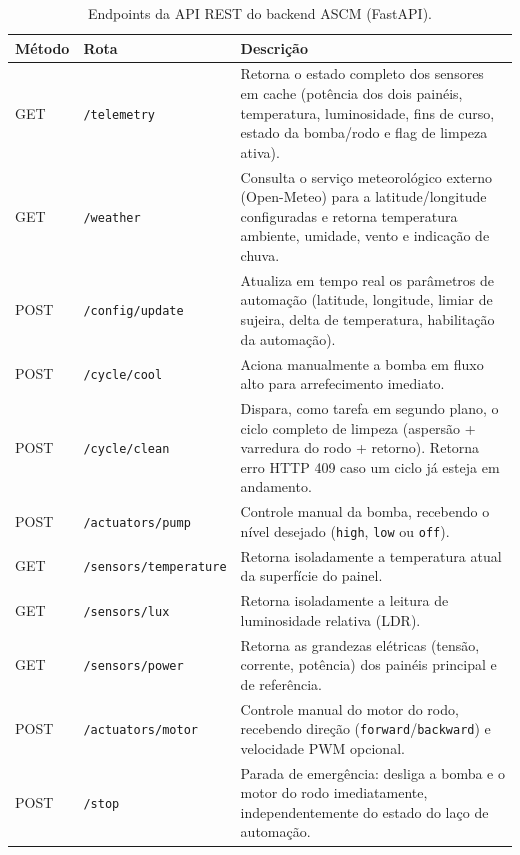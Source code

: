\documentclass[12pt, a4paper]{article}
\begin{document}
\begin{table}[htbp]
    \centering
    \caption{Endpoints da API REST do backend ASCM (FastAPI).}
    \label{tab:endpoints}
    \begin{tabular}{p{1.4cm}p{3.2cm}p{7.2cm}}
    \toprule
    \textbf{Método} & \textbf{Rota} & \textbf{Descrição} \\
    \midrule
    GET & \texttt{/telemetry} & Retorna o estado completo dos sensores em cache (potência dos dois painéis, temperatura, luminosidade, fins de curso, estado da bomba/rodo e flag de limpeza ativa). \\
    GET & \texttt{/weather} & Consulta o serviço meteorológico externo (Open-Meteo) para a latitude/longitude configuradas e retorna temperatura ambiente, umidade, vento e indicação de chuva. \\
    POST & \texttt{/config/update} & Atualiza em tempo real os parâmetros de automação (latitude, longitude, limiar de sujeira, delta de temperatura, habilitação da automação). \\
    POST & \texttt{/cycle/cool} & Aciona manualmente a bomba em fluxo alto para arrefecimento imediato. \\
    POST & \texttt{/cycle/clean} & Dispara, como tarefa em segundo plano, o ciclo completo de limpeza (aspersão + varredura do rodo + retorno). Retorna erro HTTP 409 caso um ciclo já esteja em andamento. \\
    POST & \texttt{/actuators/pump} & Controle manual da bomba, recebendo o nível desejado (\texttt{high}, \texttt{low} ou \texttt{off}). \\
    GET & \texttt{/sensors/temperature} & Retorna isoladamente a temperatura atual da superfície do painel. \\
    GET & \texttt{/sensors/lux} & Retorna isoladamente a leitura de luminosidade relativa (LDR). \\
    GET & \texttt{/sensors/power} & Retorna as grandezas elétricas (tensão, corrente, potência) dos painéis principal e de referência. \\
    POST & \texttt{/actuators/motor} & Controle manual do motor do rodo, recebendo direção (\texttt{forward}/\texttt{backward}) e velocidade PWM opcional. \\
    POST & \texttt{/stop} & Parada de emergência: desliga a bomba e o motor do rodo imediatamente, independentemente do estado do laço de automação. \\
    \bottomrule
    \end{tabular}
\end{table}
\end{document}
